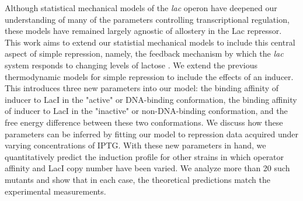 Although statistical mechanical models of the \textit{lac} operon have deepened our understanding of many of the parameters controlling transcriptional regulation, these models have remained largely agnostic of allostery in the Lac repressor. This work aims to extend our statistial mechanical models to include this central aspect of
simple repression, namely, the feedback mechanism by which the \textit{lac}
system responds to changing levels of lactose \cite{JACOB1961}. We extend the previous thermodynamic models for simple repression
to include the effects of an inducer. This introduces three new parameters into
our model: the binding affinity of inducer to LacI in the
"active" or DNA-binding conformation, the binding affinity of inducer to LacI in the "inactive" or non-DNA-binding conformation, and the free energy difference between these two conformations. We discuss how these parameters can be inferred by fitting our model to repression data acquired under varying concentrations of IPTG. With these new parameters in hand, we quantitatively predict the induction profile for other strains in which operator affinity and LacI copy number have been varied. We analyze more than 20 such mutants and show that in each case, the theoretical predictions match
the experimental measurements. 

